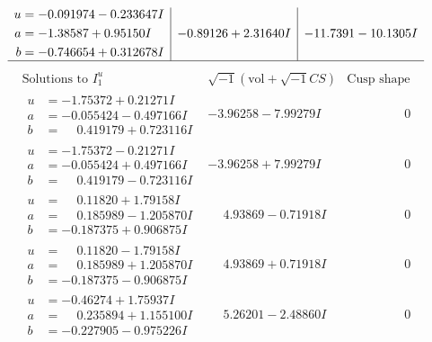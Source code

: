 \documentclass[1p]{elsarticle_modified}
\theoremstyle{definition}
\newcommand{\I}{\sqrt{-1}}
\begin{document}
$$\begin{array}{c|c|c}
\begin{aligned}
u &= -0.091974 - 0.233647 I \\
a &= -1.38587 + 0.95150 I \\
b &= -0.746654 + 0.312678 I\end{aligned}
 & -0.89126 + 2.31640 I & -11.7391 - 10.1305 I\\
 \hline 
 \end{array}$$\newpage$$\begin{array}{c|c|c}  
\text{Solutions to }I^u_{1}& \I (\text{vol} + \sqrt{-1}CS) & \text{Cusp shape}\\
 \hline 
\begin{aligned}
u &= -1.75372 + 0.21271 I \\
a &= -0.055424 - 0.497166 I \\
b &= \phantom{-}0.419179 + 0.723116 I\end{aligned}
 & -3.96258 - 7.99279 I & \phantom{-0.000000 } 0 \\ \hline\begin{aligned}
u &= -1.75372 - 0.21271 I \\
a &= -0.055424 + 0.497166 I \\
b &= \phantom{-}0.419179 - 0.723116 I\end{aligned}
 & -3.96258 + 7.99279 I & \phantom{-0.000000 } 0 \\ \hline\begin{aligned}
u &= \phantom{-}0.11820 + 1.79158 I \\
a &= \phantom{-}0.185989 - 1.205870 I \\
b &= -0.187375 + 0.906875 I\end{aligned}
 & \phantom{-}4.93869 - 0.71918 I & \phantom{-0.000000 } 0 \\ \hline\begin{aligned}
u &= \phantom{-}0.11820 - 1.79158 I \\
a &= \phantom{-}0.185989 + 1.205870 I \\
b &= -0.187375 - 0.906875 I\end{aligned}
 & \phantom{-}4.93869 + 0.71918 I & \phantom{-0.000000 } 0 \\ \hline\begin{aligned}
u &= -0.46274 + 1.75937 I \\
a &= \phantom{-}0.235894 + 1.155100 I \\
b &= -0.227905 - 0.975226 I\end{aligned}
 & \phantom{-}5.26201 - 2.48860 I & \phantom{-0.000000 } 0 \\ \hline\begin{aligned}

\end{aligned}
\end{array}$$
\end{document}
